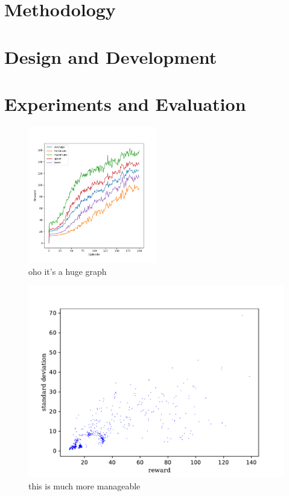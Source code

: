 \documentclass[10pt,journal]{IEEEtran}
\begin{document}
\section{Methodology}

\section{Design and Development}

\section{Experiments and Evaluation}

\begin{figure}
  \caption{oho it's a huge graph}
  \centering
  \includegraphics[width=0.5\textwidth]{Figure_1.png}
\end{figure}

\begin{figure}
  \caption{this is much more manageable}
  \centering
  \includegraphics[scale=0.5]{Figure_2.pdf}
\end{figure}
\end{document}
